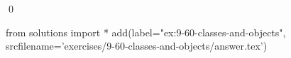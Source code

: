 
\begin{ex}
  \label{ex:9-60-classes-and-objects}
  
  \qed
\end{ex}
\begin{python0}
from solutions import *
add(label="ex:9-60-classes-and-objects",
    srcfilename='exercises/9-60-classes-and-objects/answer.tex')
\end{python0}
